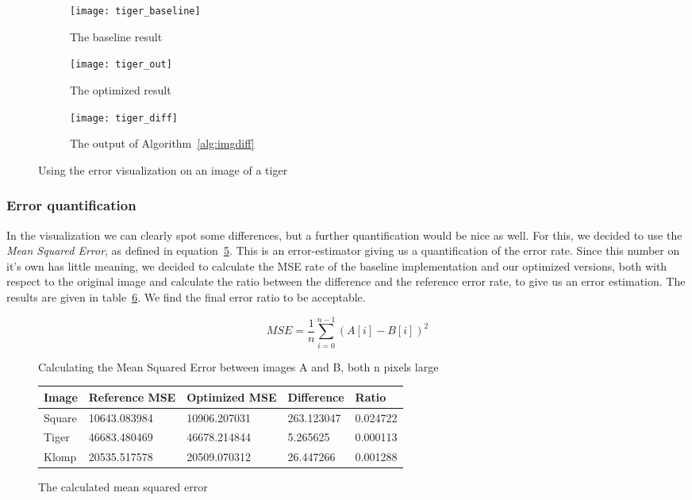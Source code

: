\begin{figure}
    \centering
    \begin{subfigure}[b]{0.3\textwidth}
            \texttt{[image: tiger\_baseline]}
            \caption{The baseline result}
            \label{fig:er_tiger_baseline}
    \end{subfigure}
    \begin{subfigure}[b]{0.3\textwidth}
            \texttt{[image: tiger\_out]}
            \caption{The optimized result}
            \label{fig:er_tiger_out}
    \end{subfigure}
    \begin{subfigure}[b]{0.3\textwidth}
            \texttt{[image: tiger\_diff]}
            \caption{The output of Algorithm~\ref{alg:imgdiff}}
            \label{fig:er_tiger_diff}
    \end{subfigure}
    \caption{Using the error visualization on an image of a tiger}
    \label{fig:imgdiff}
\end{figure}

\subsubsection{Error quantification}
In the visualization we can clearly spot some differences, but a further quantification would be nice as well. For this, we decided to use the \emph{Mean Squared Error}, as defined in equation~\ref{eq:mse}. This is an error-estimator giving us a quantification of the error rate. Since this number on it's own has little meaning, we decided to calculate the MSE rate of the baseline implementation and our optimized versions, both with respect to the original image and calculate the ratio between the difference and the reference error rate, to give us an error estimation. The results are given in table~\ref{tab:mse}. We find the final error ratio to be acceptable.

\begin{figure}[h]
    \begin{equation}
    MSE = \frac{1}{n} \sum_{i=0}^{n-1} (A[i] - B[i])^{2}
    \end{equation}
    \caption{Calculating the Mean Squared Error between images A and B, both n pixels large}
    \label{eq:mse}
\end{figure}

\begin{figure}[h!]
    \centering
    \begin{tabular}{l | l l l l}
    Image   & Reference MSE & Optimized MSE     & Difference    & Ratio     \\
    \hline
    Square  & 10643.083984  & 10906.207031      & 263.123047    & 0.024722  \\
    Tiger   & 46683.480469  & 46678.214844      & 5.265625      & 0.000113  \\
    Klomp   & 20535.517578  & 20509.070312      & 26.447266     & 0.001288
    \end{tabular}
    \caption{The calculated mean squared error}
    \label{tab:mse}
\end{figure}

